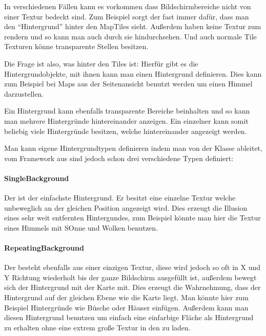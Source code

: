 In verschiedenen Fällen kann es vorkommen dass Bildschirmbereiche nicht von einer Textur bedeckt sind. Zum Beispiel sorgt der  fast immer dafür, dass man den ``Hintergrund'' hinter den MapTiles sieht. Außerdem haben  keine Textur zum rendern und so kann man auch durch sie hindurchsehen. Und auch normale Tile Texturen könne transparente Stellen besitzen.

Die Frage ist also, was hinter den Tiles ist: Hierfür gibt es die Hintergrundobjekte, mit ihnen kann man einen Hintergrund definieren.
Dies kann zum Beispiel bei Maps aus der Seitenansicht benutzt werden um einen Himmel darzustellen.


Ein Hintergrund kann ebenfalls transparente Bereiche beinhalten und so kann man mehrere Hintergründe hintereinander anzeigen. Ein einzelner  kann somit beliebig viele Hintergründe besitzen, welche hintereinander angezeigt werden. 

Man kann eigene Hintergrundtypen definieren indem man von der Klasse  ableitet, vom Framework aus sind jedoch schon drei verschiedene Typen definiert:

\paragraph{SingleBackground}

Der  ist der einfachste Hintergrund. Er besitzt eine einzelne Textur welche unbeweglich an der gleichen Position angezeigt wird.
Dies erzeugt die Illusion eines sehr weit entfernten Hintergundes, zum Beispiel könnte man hier die Textur eines Himmels mit SOnne und Wolken benutzen.

\paragraph{RepeatingBackground}

Der  besteht ebenfalls aus einer einzigen Textur, diese wird jedoch so oft in X und Y Richtung wiederholt bis der ganze Bildschirm ausgefüllt ist, außerdem bewegt sich der Hintergrund mit der Karte mit. Dies erzeugt die Wahrnehmung, dass der Hintergrund auf der gleichen Ebene wie die Karte liegt. Man könnte hier zum Beispiel Hintergründe wie Büsche oder Häuser einfügen. 
Außerdem kann man diesen Hintergrund benutzen um einfach eine einfarbige Fläche als Hintergrund zu erhalten ohne eine extrem große Textur in den  zu laden.

